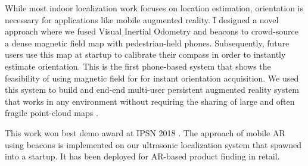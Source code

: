\documentclass[10pt]{article}
\begin{document}
While most indoor localization work focuses on location
estimation, orientation is necessary for applications like mobile
augmented reality. %
I designed a novel approach where we fused Visual
Inertial Odometry and beacons to crowd-source a dense magnetic field
map with pedestrian-held phones. Subsequently, future users use this map at startup to calibrate
their compass in order to instantly estimate orientation. %
This is the first phone-based system that shows the feasibility of using magnetic field for
for instant orientation acquisition. %
We used
this system to build and end-end multi-user persistent augmented
reality system that works in any environment without requiring the
sharing of large and often fragile point-cloud maps \cite{mobileAR}. 

This work won best demo award at IPSN 2018 \cite{rajagopal2018welcome}. The approach of mobile AR using beacons is implemented on our ultrasonic localization system that spawned into a startup. It has been deployed for AR-based product finding in retail. 




\end{document}
